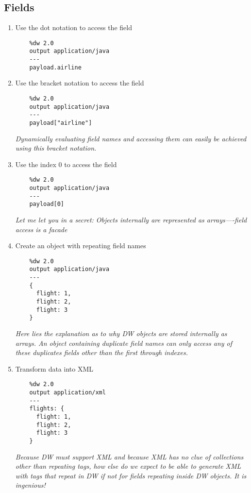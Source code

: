 \subsection{Fields}
\begin{enumerate}[resume*]
\item Use the dot notation to access the  field
  \begin{verbatim}
    %dw 2.0
    output application/java
    ---
    payload.airline    
  \end{verbatim}
\item Use the bracket notation to access the  field
  \begin{verbatim}
    %dw 2.0
    output application/java
    ---
    payload["airline"]    
  \end{verbatim}
  \emph{
    Dynamically evaluating field names and accessing them can easily be achieved using this bracket notation.
  }
\item Use the index 0 to access the  field
  \begin{verbatim}
    %dw 2.0
    output application/java
    ---
    payload[0]
  \end{verbatim}
  \emph{
    Let me let you in a secret: Objects internally are represented as arrays—-field access is a facade
  }
\item Create an object with repeating field names
  \begin{verbatim}
    %dw 2.0
    output application/java
    ---
    {
      flight: 1,
      flight: 2,
      flight: 3
    }
  \end{verbatim}
  \emph{
    Here lies the explanation as to why DW objects are stored internally as arrays.  An object containing duplicate field names can only access any of these duplicates fields other than the first through indexes.
    }
\item Transform data into XML
  \begin{verbatim}
    %dw 2.0
    output application/xml
    ---
    flights: {
      flight: 1,
      flight: 2,
      flight: 3
    }
  \end{verbatim}
  \emph{
    Because DW must support XML and because XML has no clue of collections other than repeating tags, how else do we expect to be able to generate XML with tags that repeat in DW if not for fields repeating inside DW objects.  It is ingenious!
  }
\end{enumerate}

